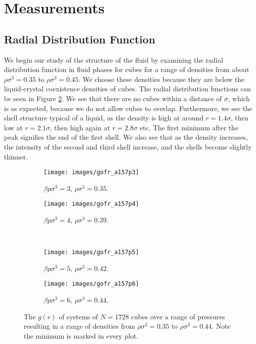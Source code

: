 \documentclass[thesis]{subfiles}
\begin{document}
\newpage

\section{Measurements}

\subsection{Radial Distribution Function} \label{subsec:res_rdf}

We begin our study of the structure of the fluid by examining the radial distribution function in fluid phases for cubes for a range of densities from about $\rho\sigma^3 = 0.35$ to $\rho\sigma^3 = 0.45$. We choose these densities because they are below the liquid-crystal coexistence densities of cubes. The radial distribution functions can be seen in Figure \ref{fig:gofr_90liq}. We see that there are no cubes within a distance of $\sigma$, which is as expected, because we do not allow cubes to overlap. Furthermore, we see the shell structure typical of a liquid, as the density is high at around $r=1.4\sigma$, then low at $r=2.1\sigma$, then high again at $r=2.8\sigma$ etc.
The first minimum after the peak signifies the end of the first shell. We also see that as the density increases, the intensity of the second and third shell increase, and the shells become slightly thinner.

\begin{figure}[h]
	\centering
	\begin{subfigure}{0.49\textwidth}
		\texttt{[image: images/gofr\_a157p3]}
		\caption{$\beta p \sigma^3 = 3$, $\rho \sigma^3 = 0.35$. }
	\end{subfigure}
	\begin{subfigure}{0.49\textwidth}
		\texttt{[image: images/gofr\_a157p4]}
		\caption{$\beta p \sigma^3 = 4$, $\rho \sigma^3 = 0.39$. }
	\end{subfigure}
\\
\vspace{10pt}
	\begin{subfigure}{0.49\textwidth}
		\texttt{[image: images/gofr\_a157p5]}
		\caption{$\beta p \sigma^3 = 5$, $\rho \sigma^3 = 0.42$. }
	\end{subfigure}
	\begin{subfigure}{0.49\textwidth}
		\texttt{[image: images/gofr\_a157p6]}
		\caption{$\beta p \sigma^3 = 6$, $\rho \sigma^3 = 0.44$. }\label{fig:gofr_90liqp6}
	\end{subfigure}

	\caption{The $g(r)$ of systems of $N = 1728$ cubes over a range of pressures resulting in a range of densities from $\rho\sigma^3 = 0.35$ to $\rho\sigma^3 = 0.44$. Note the minimum is marked in every plot.}\label{fig:gofr_90liq}
\end{figure}
\end{document}
